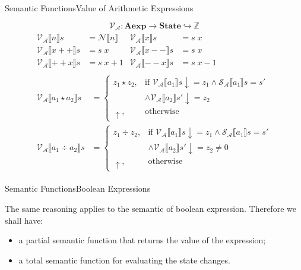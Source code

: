 \documentclass{beamer}
\newcommand{\Aexp}{\textbf{Aexp}}
\newcommand{\State}{\textbf{State}}
\newcommand{\Z}{\mathbb{Z}}
\newcommand{\sem}[2]{\mathcal{#1} \llbracket #2 \rrbracket}
\newcommand{\undefined}{\uparrow}
\newcommand{\defined}{\!\downarrow}
\begin{document}
\begin{frame}{Semantic Functions}{Value of Arithmetic Expressions}

    $$\mathcal{V_A} : \Aexp \to \State \hookrightarrow \Z$$
    \begin{gather*}
        \begin{aligned}
            \sem{V_A}{n}s     & = \sem{N}{n} &
            \sem{V_A}{x}s     & = s\;x         \\
            \sem{V_A}{x+\!+}s & = s\;x       &
            \sem{V_A}{x-\!-}s & = s\;x         \\
            \sem{V_A}{+\!+x}s & = s\;x+1     &
            \sem{V_A}{-\!-x}s & = s\;x-1
        \end{aligned} \\
        \begin{aligned}
            \sem{V_A}{a_1 \star a_2}s & =
            \begin{cases}
                z_1 \star z_2,
                 & \mbox{if } \sem{V_A}{a_1}s \defined = z_1 \wedge \sem{S_A}{a_1}s = s' \\
                 & \wedge \sem{V_A}{a_2}s' \defined = z_2                                \\
                \undefined,
                 & \mbox{otherwise}
            \end{cases} \\
            \sem{V_A}{a_1 \div a_2}s  & =
            \begin{cases}
                z_1 \div z_2,
                 & \mbox{if } \sem{V_A}{a_1}s \defined = z_1 \wedge \sem{S_A}{a_1}s = s' \\
                 & \wedge \sem{V_A}{a_2}s' \defined = z_2 \neq 0                         \\
                \undefined,
                 & \mbox{otherwise}
            \end{cases}
        \end{aligned}
    \end{gather*}

\end{frame}

\begin{frame}{Semantic Functions}{Boolean Expressions}

    The same reasoning applies to the semantic of boolean expression.
    Therefore we shall have:
    \begin{itemize}
        \item a partial semantic function that returns the value of the expression;
        \item a total semantic function for evaluating the state changes.
    \end{itemize}

\end{frame}
\end{document}
